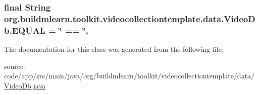 \subsubsection[{\texorpdfstring{E\+Q\+U\+AL}{EQUAL}}]{\setlength{\rightskip}{0pt plus 5cm}final String org.\+buildmlearn.\+toolkit.\+videocollectiontemplate.\+data.\+Video\+Db.\+E\+Q\+U\+AL = \char`\"{} == \char`\"{}\hspace{0.3cm}{\ttfamily [static]}, {\ttfamily [private]}}\hypertarget{classorg_1_1buildmlearn_1_1toolkit_1_1videocollectiontemplate_1_1data_1_1VideoDb_a5ac0075863866227b76d29e8a8369525}{}\label{classorg_1_1buildmlearn_1_1toolkit_1_1videocollectiontemplate_1_1data_1_1VideoDb_a5ac0075863866227b76d29e8a8369525}


The documentation for this class was generated from the following file\+:\begin{DoxyCompactItemize}
\item 
source-\/code/app/src/main/java/org/buildmlearn/toolkit/videocollectiontemplate/data/\hyperlink{VideoDb_8java}{Video\+Db.\+java}\end{DoxyCompactItemize}
